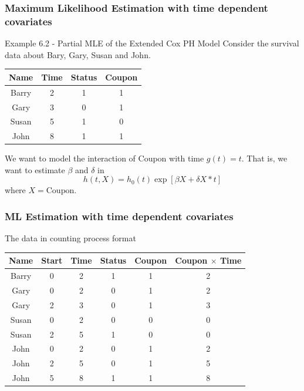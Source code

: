 \documentclass{beamer}
\theoremstyle{definition}
\begin{document}
\begin{frame}
\frametitle{Maximum Likelihood Estimation with time dependent covariates}
\begin{block}{Example 6.2 - Partial MLE of the Extended Cox PH Model}
Consider the survival data about Bary, Gary, Susan and John.
\begin{center}
\begin{tabular}{ c c c c } \hline
 Name & Time & Status & Coupon \\ \hline
Barry & 2 & 1 & 1 \\
 Gary & 3 & 0 & 1 \\
Susan & 5 & 1 & 0 \\
  John & 8 & 1 & 1 \\
\end{tabular}
\end{center}
\end{block}
We want to model the interaction of Coupon with time $g(t)=t$. That is, we want to estimate $\beta$ and $\delta$ in
\[
h(t,X) = h_0(t) \exp[\beta X+ \delta X *t]
\]
where $X=\text{Coupon}$.
\end{frame}

\begin{frame}
\frametitle{ML Estimation with time dependent covariates}
\begin{block}{The data in counting process format}
\begin{table}[]
\begin{tabular}{c c c c c c}
Name  & Start & Time & Status & Coupon & Coupon $\times$ Time \\ \hline
Barry & 0     & 2    & 1      & 1      & 2                    \\
Gary  & 0     & 2    & 0      & 1      & 2                    \\
Gary  & 2     & 3    & 0      & 1      & 3                    \\
Susan & 0     & 2    & 0      & 0      & 0                    \\
Susan & 2     & 5    & 1      & 0      & 0                    \\
John  & 0     & 2    & 0      & 1      & 2                    \\
John  & 2     & 5    & 0      & 1      & 5                    \\
John  & 5     & 8    & 1      & 1      & 8
\end{tabular}
\end{table}
\end{block}
\end{frame}
\end{document}

